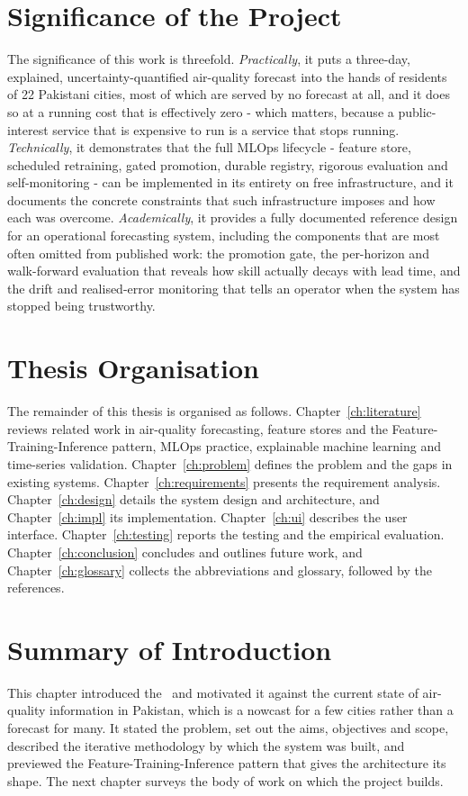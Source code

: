 \section{Significance of the Project}
The significance of this work is threefold. \emph{Practically}, it puts a
three-day, explained, uncertainty-quantified air-quality forecast into the hands
of residents of 22 Pakistani cities, most of which are served by no forecast at
all, and it does so at a running cost that is effectively zero - which matters,
because a public-interest service that is expensive to run is a service that
stops running. \emph{Technically}, it demonstrates that the full MLOps lifecycle
- feature store, scheduled retraining, gated promotion, durable registry,
rigorous evaluation and self-monitoring - can be implemented in its entirety on
free infrastructure, and it documents the concrete constraints that such
infrastructure imposes and how each was overcome. \emph{Academically}, it
provides a fully documented reference design for an operational forecasting
system, including the components that are most often omitted from published work:
the promotion gate, the per-horizon and walk-forward evaluation that reveals how
skill actually decays with lead time, and the drift and realised-error monitoring
that tells an operator when the system has stopped being trustworthy.

\section{Thesis Organisation}
The remainder of this thesis is organised as follows.
Chapter~\ref{ch:literature} reviews related work in air-quality forecasting,
feature stores and the Feature-Training-Inference pattern, MLOps practice,
explainable machine learning and time-series validation.
Chapter~\ref{ch:problem} defines the problem and the gaps in existing systems.
Chapter~\ref{ch:requirements} presents the requirement analysis.
Chapter~\ref{ch:design} details the system design and architecture, and
Chapter~\ref{ch:impl} its implementation. Chapter~\ref{ch:ui} describes the user
interface. Chapter~\ref{ch:testing} reports the testing and the empirical
evaluation. Chapter~\ref{ch:conclusion} concludes and outlines future work, and
Chapter~\ref{ch:glossary} collects the abbreviations and glossary, followed by
the references.

\section{Summary of Introduction}
This chapter introduced the \projname\ and motivated it against the current state
of air-quality information in Pakistan, which is a nowcast for a few cities
rather than a forecast for many. It stated the problem, set out the aims,
objectives and scope, described the iterative methodology by which the system was
built, and previewed the Feature-Training-Inference pattern that gives the
architecture its shape. The next chapter surveys the body of work on which the
project builds.
